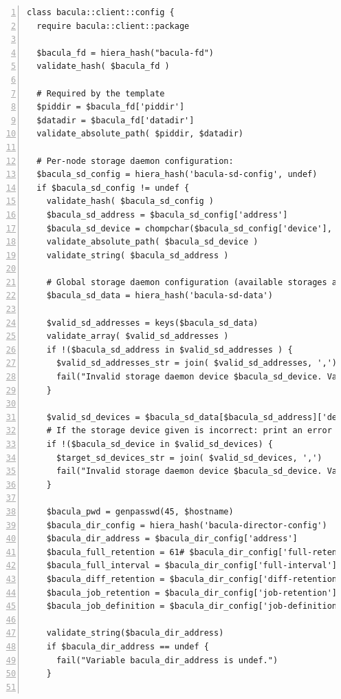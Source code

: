 \documentclass[14 pt,a4paper]{extreport}
\begin{document}
\begin{framed}
\begin{Verbatim}[fontsize=\tiny,numbers=left]
class bacula::client::config {
  require bacula::client::package

  $bacula_fd = hiera_hash("bacula-fd")
  validate_hash( $bacula_fd )

  # Required by the template
  $piddir = $bacula_fd['piddir']
  $datadir = $bacula_fd['datadir']
  validate_absolute_path( $piddir, $datadir)

  # Per-node storage daemon configuration:
  $bacula_sd_config = hiera_hash('bacula-sd-config', undef)
  if $bacula_sd_config != undef {
    validate_hash( $bacula_sd_config )
    $bacula_sd_address = $bacula_sd_config['address']
    $bacula_sd_device = chompchar($bacula_sd_config['device'], "/")
    validate_absolute_path( $bacula_sd_device )
    validate_string( $bacula_sd_address )

    # Global storage daemon configuration (available storages and devices)
    $bacula_sd_data = hiera_hash('bacula-sd-data')

    $valid_sd_addresses = keys($bacula_sd_data)
    validate_array( $valid_sd_addresses )
    if !($bacula_sd_address in $valid_sd_addresses ) {
      $valid_sd_addresses_str = join( $valid_sd_addresses, ',')
      fail("Invalid storage daemon device $bacula_sd_device. Valids are '$target_sd_devices_str'")
    }

    $valid_sd_devices = $bacula_sd_data[$bacula_sd_address]['devices']
    # If the storage device given is incorrect: print an error and fail the compilation
    if !($bacula_sd_device in $valid_sd_devices) {
      $target_sd_devices_str = join( $valid_sd_devices, ',')
      fail("Invalid storage daemon device $bacula_sd_device. Valids are '$target_sd_devices_str'")
    }

	$bacula_pwd = genpasswd(45, $hostname)
    $bacula_dir_config = hiera_hash('bacula-director-config')
    $bacula_dir_address = $bacula_dir_config['address']
    $bacula_full_retention = 61# $bacula_dir_config['full-retention'].scanf("%i")
    $bacula_full_interval = $bacula_dir_config['full-interval']
    $bacula_diff_retention = $bacula_dir_config['diff-retention']
    $bacula_job_retention = $bacula_dir_config['job-retention']
    $bacula_job_definition = $bacula_dir_config['job-definition']

    validate_string($bacula_dir_address)
    if $bacula_dir_address == undef {
      fail("Variable bacula_dir_address is undef.")
    }


\end{Verbatim}
\end{framed}
\end{document}
